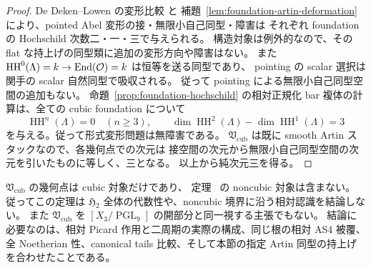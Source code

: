\begin{proof}
De Deken--Lowen の変形比較
\cite[Theorem 5.15]{DeDekenLowen2011} と
補題~\ref{lem:foundation-artin-deformation} により、pointed Abel 変形の接・無限小自己同型・障害は
それぞれ foundation の Hochschild 次数二・一・三で与えられる。
構造対象は例外的なので、その flat な持上げの同型類に追加の変形方向や障害はない。
また $\operatorname{HH}^0(\Lambda)=k\to\operatorname{End}(\mathcal O)=k$ は恒等を送る同型であり、
pointing の scalar 選択は関手の scalar 自然同型で吸収される。
従って pointing による無限小自己同型空間の追加もない。
命題~\ref{prop:foundation-hochschild} の相対正規化 bar 複体の計算は、全ての cubic foundation について
\[
 \operatorname{HH}^n(\Lambda)=0\quad(n\ge3),\qquad
 \dim\operatorname{HH}^2(\Lambda)-\dim\operatorname{HH}^1(\Lambda)=3
\]
を与える。従って形式変形問題は無障害である。
$\mathfrak V_{\mathrm{cub}}$ は既に smooth Artin スタックなので、各幾何点での次元は
接空間の次元から無限小自己同型空間の次元を引いたものに等しく、三となる。
以上から純次元三を得る。
\end{proof}

\begin{remark}
$\mathfrak V_{\mathrm{cub}}$ の幾何点は cubic 対象だけであり、
定理~\cite[\texttt{thm:complete-h2-classification}]{QuadricIntrinsic2026} の noncubic 対象は含まない。
従ってこの定理は $\mathfrak H_2$ 全体の代数性や、noncubic 境界に沿う相対認識を結論しない。
また $\mathfrak V_{\mathrm{cub}}$ を $[X_3/\operatorname{PGL}_9]$ の開部分と同一視する主張でもない。
結論に必要なのは、相対 Picard 作用と二周期の実際の構成、同じ根の相対 AS4 被覆、
全 Noetherian 性、canonical tails 比較、そして本節の指定 Artin 同型の持上げを合わせたことである。
\end{remark}
